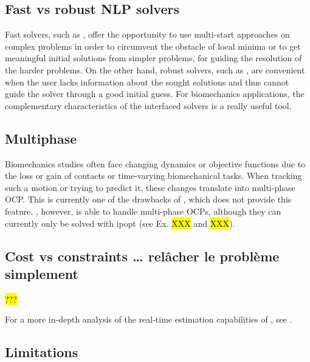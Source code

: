 \subsection{Fast vs robust NLP solvers}

Fast solvers, such as \acados, offer the opportunity to use multi-start approaches on complex problems in order to circumvent the obstacle of local minima \cite{huchez2015local, bailly2020optimal} or to get meaningful initial solutions from simpler problems, for guiding the resolution of the harder problems.
On the other hand, robust solvers, such as \ipopt, are convenient when the user lacks information about the sought solutions and thus cannot guide the solver through a good initial guess.
For biomechanics applications, the complementary characteristics of the interfaced solvers is a really useful tool.

\subsection{Multiphase}

Biomechanics studies often face changing dynamics or objective functions due to the loss or gain of contacts or time-varying biomechanical tasks.
When tracking such a motion or trying to predict it, these changes translate into multi-phase OCP.
This is currently one of the drawbacks of \moco, which does not provide this feature.
\bioptim, however, is able to handle multi-phase OCPs, although they can currently only be solved with ipopt (see Ex. \hl{XXX} and \hl{XXX}).


\subsection{Cost vs constraints … relâcher le problème simplement}

\hl{???}

For a more in-depth analysis of the real-time estimation capabilities of \bioptim, see \cite{bailly2020real}.

\subsection{Limitations}


